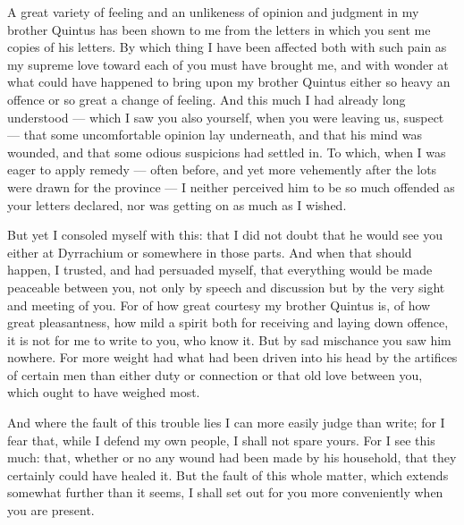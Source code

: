 

 A great variety of feeling and an unlikeness of opinion and judgment in my brother Quintus has been shown to me from the letters in which you sent me copies of his letters. By which thing I have been affected both with such pain as my supreme love toward each of you must have brought me, and with wonder at what could have happened to bring upon my brother Quintus either so heavy an offence or so great a change of feeling. And this much I had already long understood --- which I saw you also yourself, when you were leaving us, suspect --- that some uncomfortable opinion lay underneath, and that his mind was wounded, and that some odious suspicions had settled in. To which, when I was eager to apply remedy --- often before, and yet more vehemently after the lots were drawn for the province --- I neither perceived him to be so much offended as your letters declared, nor was getting on as much as I wished.

 But yet I consoled myself with this: that I did not doubt that he would see you either at Dyrrachium or somewhere in those parts. And when that should happen, I trusted, and had persuaded myself, that everything would be made peaceable between you, not only by speech and discussion but by the very sight and meeting of you. For of how great courtesy my brother Quintus is, of how great pleasantness, how mild a spirit both for receiving and laying down offence, it is not for me to write to you, who know it. But by sad mischance you saw him nowhere. For more weight had what had been driven into his head by the artifices of certain men than either duty or connection or that old love between you, which ought to have weighed most.

 And where the fault of this trouble lies I can more easily judge than write; for I fear that, while I defend my own people, I shall not spare yours. For I see this much: that, whether or no any wound had been made by his household, that they certainly could have healed it. But the fault of this whole matter, which extends somewhat further than it seems, I shall set out for you more conveniently when you are present.

